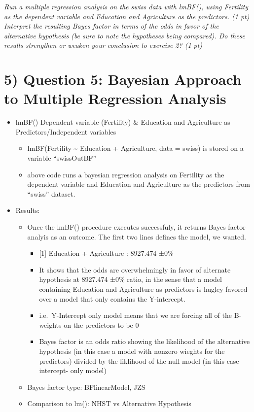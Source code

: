 \documentclass[]{article}
\providecommand{\tightlist}{%
  \setlength{\itemsep}{0pt}\setlength{\parskip}{0pt}}
\begin{document}
\emph{Run a multiple regression analysis on the swiss data with lmBF(),
using Fertility as the dependent variable and Education and Agriculture
as the predictors. (1 pt) Interpret the resulting Bayes factor in terms
of the odds in favor of the alternative hypothesis (be sure to note the
hypotheses being compared). Do these results strengthen or weaken your
conclusion to exercise 2? (1 pt)}

\hypertarget{question-5-bayesian-approach-to-multiple-regression-analysis}{%
\section{5) Question 5: Bayesian Approach to Multiple Regression
Analysis}\label{question-5-bayesian-approach-to-multiple-regression-analysis}}

\begin{itemize}
\tightlist
\item
  lmBF() \textbar{} Dependent variable (Fertility) \& Education and
  Agriculture as Predictors/Independent variables

  \begin{itemize}
  \tightlist
  \item
    lmBF(Fertility \textasciitilde{} Education + Agriculture, data =
    swiss) is stored on a variable ``swissOutBF''
  \item
    above code runs a bayesian regression analysis on Fertility as the
    dependent variable and Education and Agriculture as the predictors
    from ``swiss'' dataset.
  \end{itemize}
\item
  Results:

  \begin{itemize}
  \tightlist
  \item
    Once the lmBF() procedure executes successfuly, it returns Bayes
    factor analyis as an outcome. The first two lines defines the model,
    we wanted.

    \begin{itemize}
    \tightlist
    \item
      {[}1{]} Education + Agriculture : 8927.474 ±0\%
    \item
      It shows that the odds are overwhelmingly in favor of alternate
      hypothesis at 8927.474 ±0\% ratio, in the sense that a model
      containing Education and Agriculture as predictors is hugley
      favored over a model that only contains the Y-intercept.
    \item
      i.e.~Y-Intercept only model means that we are forcing all of the
      B-weights on the predictors to be 0
    \item
      Bayes factor is an odds ratio showing the likelihood of the
      alternative hypothesis (in this case a model with nonzero wieghts
      for the predictors) divided by the liklihood of the null model (in
      this case intercept- only model)
    \end{itemize}
  \item
    Bayes factor type: BFlinearModel, JZS
  \item
    Comparison to lm(): NHST vs Alternative Hypothesis


\end{itemize}
\end{itemize}
\end{document}
